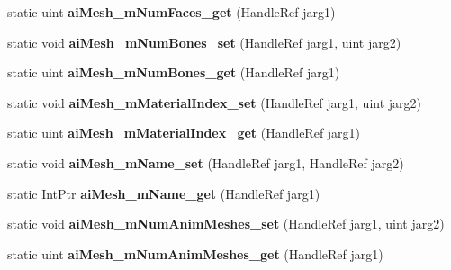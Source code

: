\begin{DoxyCompactItemize}
\item 
\hypertarget{class_assimp_p_i_n_v_o_k_e_aa0904188c9052fa6f7c257c988705b08}{static uint {\bfseries ai\+Mesh\+\_\+m\+Num\+Faces\+\_\+get} (Handle\+Ref jarg1)}\label{class_assimp_p_i_n_v_o_k_e_aa0904188c9052fa6f7c257c988705b08}

\item 
\hypertarget{class_assimp_p_i_n_v_o_k_e_a92f129deb861d008f15a3b244ff5b87f}{static void {\bfseries ai\+Mesh\+\_\+m\+Num\+Bones\+\_\+set} (Handle\+Ref jarg1, uint jarg2)}\label{class_assimp_p_i_n_v_o_k_e_a92f129deb861d008f15a3b244ff5b87f}

\item 
\hypertarget{class_assimp_p_i_n_v_o_k_e_af18601b298a1da4abf140741d7cabc5a}{static uint {\bfseries ai\+Mesh\+\_\+m\+Num\+Bones\+\_\+get} (Handle\+Ref jarg1)}\label{class_assimp_p_i_n_v_o_k_e_af18601b298a1da4abf140741d7cabc5a}

\item 
\hypertarget{class_assimp_p_i_n_v_o_k_e_ad735eb1620d3a9e17b5f8965120d0f3b}{static void {\bfseries ai\+Mesh\+\_\+m\+Material\+Index\+\_\+set} (Handle\+Ref jarg1, uint jarg2)}\label{class_assimp_p_i_n_v_o_k_e_ad735eb1620d3a9e17b5f8965120d0f3b}

\item 
\hypertarget{class_assimp_p_i_n_v_o_k_e_a09ef93a84cb8476dee7d04c62427ac8b}{static uint {\bfseries ai\+Mesh\+\_\+m\+Material\+Index\+\_\+get} (Handle\+Ref jarg1)}\label{class_assimp_p_i_n_v_o_k_e_a09ef93a84cb8476dee7d04c62427ac8b}

\item 
\hypertarget{class_assimp_p_i_n_v_o_k_e_a923ba9e190b158fa440132586b008ebf}{static void {\bfseries ai\+Mesh\+\_\+m\+Name\+\_\+set} (Handle\+Ref jarg1, Handle\+Ref jarg2)}\label{class_assimp_p_i_n_v_o_k_e_a923ba9e190b158fa440132586b008ebf}

\item 
\hypertarget{class_assimp_p_i_n_v_o_k_e_a15f975e1918fc064ae4aa1dfd6d38322}{static Int\+Ptr {\bfseries ai\+Mesh\+\_\+m\+Name\+\_\+get} (Handle\+Ref jarg1)}\label{class_assimp_p_i_n_v_o_k_e_a15f975e1918fc064ae4aa1dfd6d38322}

\item 
\hypertarget{class_assimp_p_i_n_v_o_k_e_afda8e1918318802228a44a7ce92b603e}{static void {\bfseries ai\+Mesh\+\_\+m\+Num\+Anim\+Meshes\+\_\+set} (Handle\+Ref jarg1, uint jarg2)}\label{class_assimp_p_i_n_v_o_k_e_afda8e1918318802228a44a7ce92b603e}

\item 
\hypertarget{class_assimp_p_i_n_v_o_k_e_ab3f09c484a7fc30059b536b98e82e914}{static uint {\bfseries ai\+Mesh\+\_\+m\+Num\+Anim\+Meshes\+\_\+get} (Handle\+Ref jarg1)}\label{class_assimp_p_i_n_v_o_k_e_ab3f09c484a7fc30059b536b98e82e914}


\end{DoxyCompactItemize}

